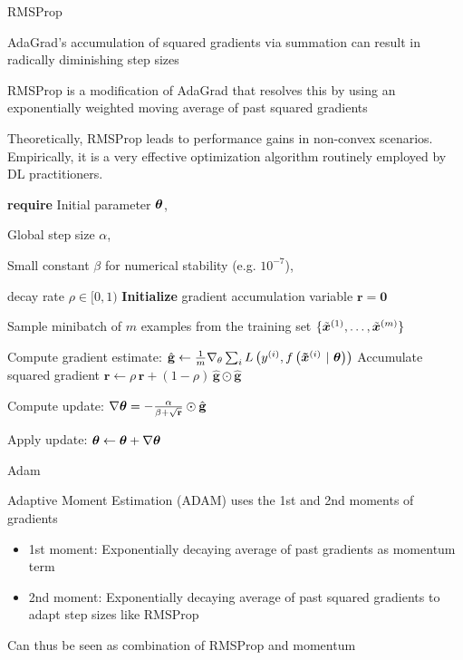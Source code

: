 \documentclass[11pt,compress,t,notes=noshow, xcolor=table]{beamer}
\begin{document}
\begin{framei}[fs=footnotesize]{RMSProp}
\item AdaGrad's accumulation of squared gradients via summation can result in radically diminishing step sizes
\item RMSProp is a modification of AdaGrad that resolves this by using an exponentially weighted moving average of past squared gradients
\item Theoretically, RMSProp leads to performance gains in non-convex scenarios. Empirically, it is a very effective optimization algorithm routinely employed by DL practitioners. 
\vspace{-0.5em}\begin{algorithm}[H]
\footnotesize
\caption{RMSProp}
\begin{algorithmic}[1]
\State \textbf{require} Initial parameter $\mathbf{\bm{\theta}}$, \strut Global step size $\alpha$, \strut Small constant $\beta$ for numerical stability (e.g. $10^{-7}$), \strut decay rate $\rho \in [0, 1)$
\State \textbf{Initialize} gradient accumulation variable $\mathbf{r} = \mathbf{0} $
\State \parbox[t]{\dimexpr\linewidth-\algorithmicindent}{Sample minibatch of $m$ examples from the training set $\{\tilde{\bm{x}}^{(1)},\dots,\tilde{\bm{x}}^{(m)}\}$ \strut}
\State Compute gradient estimate: $\hat{\mathbf{g}} \leftarrow \frac{1}{m} \nabla_\theta \sum_{i} L\left(y^{(i)}, f\left(\bm{\tilde{x}}^{(i)} ~|~ \bm{\theta}\right)\right)$
\State Accumulate squared gradient $\mathbf{r} \leftarrow \rho \, \mathbf{r} + (1 - \rho) \, \hat{\mathbf{g}} \odot  \hat{\mathbf{g}}$
\State \parbox[t]{\dimexpr\linewidth-\algorithmicindent}{Compute update: $\nabla\mathbf{\bm{\theta}} = - \frac{\alpha}{\beta + \sqrt\mathbf{r}} \odot \hat{\mathbf{g}}$ \strut}
\State Apply update: $\mathbf{\bm{\theta}} \leftarrow \mathbf{\bm{\theta}} + \nabla\mathbf{\bm{\theta}}$
\EndWhile
\end{algorithmic}
\end{algorithm}
\end{framei}


\begin{framei}{Adam}
\item Adaptive Moment Estimation (ADAM) uses the 1st and 2nd moments of gradients
\begin{itemize}
    \item 1st moment: Exponentially decaying average of past gradients as momentum term
    \item 2nd moment: Exponentially decaying average of past squared gradients to adapt step sizes like RMSProp
\end{itemize}
\item Can thus be seen as combination of RMSProp and momentum
\end{framei}
\end{document}
